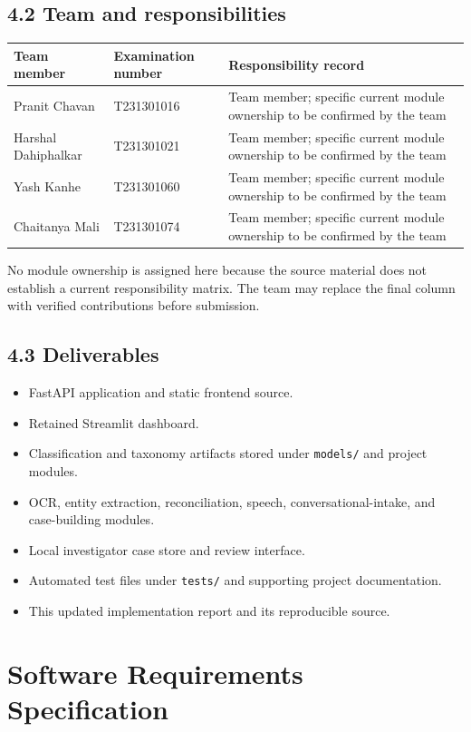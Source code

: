 \documentclass[12pt,a4paper,oneside]{report}
\begin{document}
\section{4.2 Team and responsibilities}
\begin{longtable}{p{}p{}p{}}
\toprule
\textbf{Team member} & \textbf{Examination number} & \textbf{Responsibility record} \\
\midrule
Pranit Chavan & T231301016 & Team member; specific current module ownership to be confirmed by the team \\
Harshal Dahiphalkar & T231301021 & Team member; specific current module ownership to be confirmed by the team \\
Yash Kanhe & T231301060 & Team member; specific current module ownership to be confirmed by the team \\
Chaitanya Mali & T231301074 & Team member; specific current module ownership to be confirmed by the team \\
\bottomrule
\end{longtable}
No module ownership is assigned here because the source material does not establish a current responsibility matrix. The team may replace the final column with verified contributions before submission.

\section{4.3 Deliverables}
\begin{itemize}
\item FastAPI application and static frontend source.
\item Retained Streamlit dashboard.
\item Classification and taxonomy artifacts stored under \texttt{models/} and project modules.
\item OCR, entity extraction, reconciliation, speech, conversational-intake, and case-building modules.
\item Local investigator case store and review interface.
\item Automated test files under \texttt{tests/} and supporting project documentation.
\item This updated implementation report and its reproducible source.
\end{itemize}
\clearpage\chapter{Software Requirements Specification}
\end{document}

